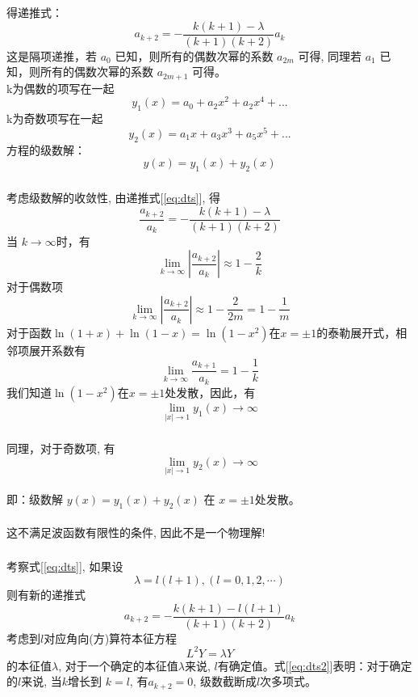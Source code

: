 \begin{frame}
得递推式：
\begin{equation} \label{eq:dts}
  a_{k+2}=-\frac{k(k+1)-\lambda}{(k+1)(k+2) }a_{k}
\end{equation}
这是隔项递推，若 $a_0$ 已知，则所有的偶数次幂的系数 $a_{2m}$ 可得, 同理若 $a_1$ 已知，则所有的偶数次幂的系数 $a_{2m+1}$ 可得。\\
k为偶数的项写在一起
\begin{equation*}
  y_{1}(x)= a_{0} + a_{2} x^2 + a_{2} x^4 +...  
\end{equation*}	
k为奇数项写在一起
\begin{equation*}
  y_{2}(x)= a_{1} x+ a_{3} x^3 + a_{5} x^5 +... 
\end{equation*}
方程的级数解：\[ y(x)=  y_{1}(x) +  y_{2}(x) \]	
\end{frame}	

\begin{frame}[label=current]
\frametitle{}
考虑级数解的收敛性, 由递推式[\ref{eq:dts}], 得
\[ \frac{a_{k+2}}{a_{k}} = -\frac{k(k+1)-\lambda}{(k+1)(k+2) }\]
当 $k \to \infty$时，有
\[ \lim_{k \to \infty}|\frac{a_{k+2}}{a_{k}}| \approx 1-\frac{2}{k}\]
对于偶数项
\[ \lim_{k \to \infty} |\frac{a_{k+2}}{a_{k}}| \approx 1-\frac{2}{2m} = 1-\frac{1}{m} \]
对于函数$\ln(1+x)+\ln(1-x) = \ln (1-x^2)$在$x=\pm 1$的泰勒展开式，相邻项展开系数有
\[ \lim_{k \to \infty} \frac{a_{k+1}}{a_{k}} = 1-\frac{1}{k} \]
我们知道$\ln (1-x^2)$在$x=\pm 1$处发散，因此，有$$ \lim_{\left \vert x \right \vert \to 1} y_{1}(x) \to \infty $$
\end{frame} 
\begin{frame}
\frametitle{}
同理，对于奇数项, 有$$ \lim_{\left \vert x \right \vert \to 1} y_{2}(x) \to \infty $$
~~\\ 
即：级数解 $ y(x)=  y_{1}(x) +  y_{2}(x) $ 在 $x=\pm 1$处发散。\\
~~\\ 
这不满足波函数有限性的条件, 因此不是一个物理解!
\end{frame} 

\begin{frame}[label=current]
\frametitle{}
考察式[\ref{eq:dts}], 如果设
\[\lambda = l(l+1), (l=0,1,2,\cdots )\]
则有新的递推式
\begin{equation}\label{eq:dts2}
  a_{k+2}=-\frac{k(k+1)-l(l+1)}{(k+1)(k+2) }a_{k}
\end{equation}
考虑到$l$对应角向(方)算符本征方程
\begin{equation*}
  L^2 Y=\lambda Y
\end{equation*}	
的本征值$\lambda$, 对于一个确定的本征值$\lambda$来说, $l$有确定值。式[\ref{eq:dts2}]表明：对于确定的$l$来说, 当$k$增长到 $k=l$, 有$a_{k+2} =0$, 级数截断成$l$次多项式。
\end{frame} 

